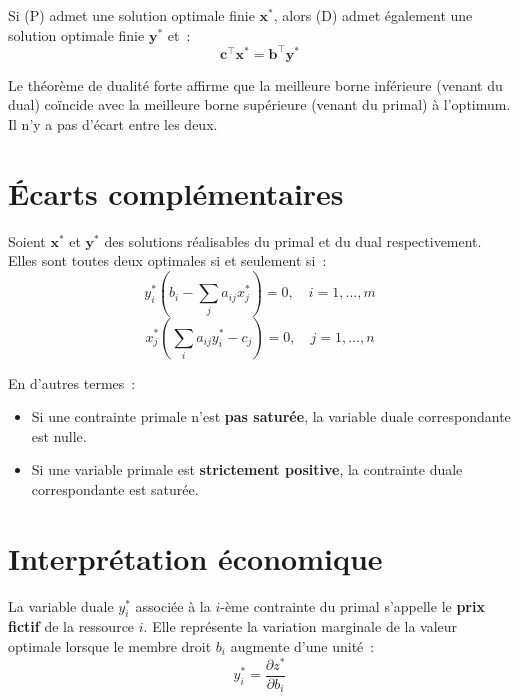 \begin{theoreme}
\label{thm:dualite_forte}
Si (P) admet une solution optimale finie $\mathbf{x}^*$, alors (D) admet
\'egalement une solution optimale finie $\mathbf{y}^*$ et~:
\[
  \mathbf{c}^\top \mathbf{x}^* = \mathbf{b}^\top \mathbf{y}^*
\]
\end{theoreme}

\begin{intuition}[title=\textbf{Interpr\'etation}]
Le th\'eor\`eme de dualit\'e forte affirme que la meilleure borne inf\'erieure
(venant du dual) co\"incide avec la meilleure borne sup\'erieure (venant du
primal) \`a l'optimum.  Il n'y a \og pas d'\'ecart \fg entre les deux.
\end{intuition}

\section{\'Ecarts compl\'ementaires}

\begin{theoreme}
\label{thm:ecarts_complementaires}
Soient $\mathbf{x}^*$ et $\mathbf{y}^*$ des solutions r\'ealisables du primal
et du dual respectivement.  Elles sont toutes deux optimales si et seulement
si~:
\[
  y_i^* \left(b_i - \sum_{j} a_{ij} x_j^*\right) = 0, \quad i = 1, \ldots, m
\]
\[
  x_j^* \left(\sum_{i} a_{ij} y_i^* - c_j\right) = 0, \quad j = 1, \ldots, n
\]
\end{theoreme}

En d'autres termes~:
\begin{itemize}
  \item Si une contrainte primale n'est \textbf{pas satur\'ee}, la variable
        duale correspondante est nulle.
  \item Si une variable primale est \textbf{strictement positive}, la
        contrainte duale correspondante est satur\'ee.
\end{itemize}

\section{Interpr\'etation \'economique}

\begin{definition}
La variable duale $y_i^*$ associ\'ee \`a la $i$-\`eme contrainte du primal
s'appelle le \textbf{prix fictif} de la ressource $i$.  Elle repr\'esente la
variation marginale de la valeur optimale lorsque le membre droit $b_i$
augmente d'une unit\'e~:
\[
  y_i^* = \frac{\partial z^*}{\partial b_i}
\]
\end{definition}

